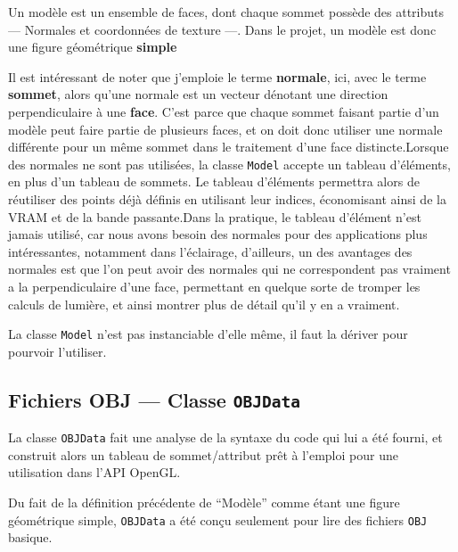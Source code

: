 \documentclass[pdftex, 11pt, a4paper, titlepage]{article}
\begin{document}
Un modèle est un ensemble de faces, dont chaque sommet possède des
attributs --- Normales et coordonnées de texture ---.  Dans le projet,
un modèle est donc une figure géométrique \textbf{simple}

Il est intéressant de noter que j'emploie le terme \textbf{normale},
ici, avec le terme \textbf{sommet}, alors qu'une normale est un
vecteur dénotant une direction perpendiculaire à une
\textbf{face}. C'est parce que chaque sommet faisant partie d'un modèle
peut faire partie de plusieurs faces, et on doit donc utiliser une
normale différente pour un même sommet dans le traitement d'une face
distincte.Lorsque des normales ne sont pas utilisées, la classe \texttt{Model}
accepte un tableau d'éléments, en plus d'un tableau de sommets. Le
tableau d'éléments permettra alors de réutiliser des points déjà
définis en utilisant leur indices, économisant ainsi de la VRAM et de
la bande passante.Dans la pratique, le tableau d'élément n'est jamais utilisé, car nous
avons besoin des normales pour des applications plus intéressantes,
notamment dans l'éclairage, d'ailleurs, un des avantages des normales
est que l'on peut avoir des normales qui ne correspondent pas vraiment
a la perpendiculaire d'une face, permettant en quelque sorte de
tromper les calculs de lumière, et ainsi montrer plus de détail qu'il
y en a vraiment.

La classe \texttt{Model} n'est pas instanciable d'elle même, il faut
la dériver pour pourvoir l'utiliser.

\pagebreak
\subsection{Fichiers OBJ --- Classe \texttt{OBJData}}

La classe \texttt{OBJData} fait une analyse de la syntaxe du code qui
lui a été fourni, et construit alors un tableau de sommet/attribut
prêt à l'emploi pour une utilisation dans l'API OpenGL.

Du fait de la définition précédente de ``Modèle'' comme étant une
figure géométrique simple, \texttt{OBJData} a été conçu seulement pour
lire des fichiers \texttt{OBJ} basique.
\end{document}
